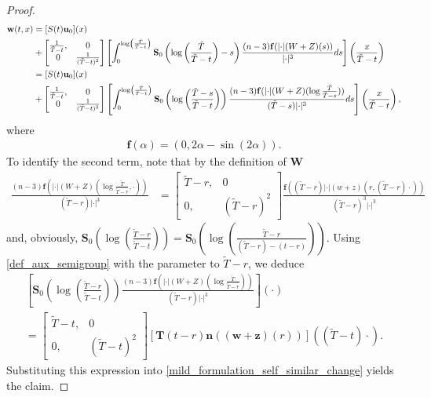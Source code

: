 \documentclass[12pt,reqno]{amsart}
\theoremstyle{plain}
\theoremstyle{remark}
\theoremstyle{plain}
\theoremstyle{definition}
\numberwithin{equation}{section}
\numberwithin{equation}{section}
\begin{document}
\begin{proof}
\begin{align}
			\mathbf{w}(t,x)&=[{S}(t)\mathbf{u}_0](x)\notag\\ &+\begin{bmatrix}  \frac{1}{\tilde{T}-t}, & 0\\ 0 & \frac{1}{(\tilde{T}-t)^2}\end{bmatrix}\left[\int_0^{\log\left(\frac{\tilde{T}}{\tilde{T}-t}\right)}\mathbf{S}_0\left(\log\left(\frac{\tilde{T}}{\tilde{T}-t}\right)-s\right)\frac{(n-3)\mathbf{f}(\lvert \cdot \rvert ({W}+Z)(s)) }{\lvert \cdot \rvert^3}ds\right]\left(\frac{x}{\tilde{T}-t}\right)\notag\\ \label{mild_formulation_self_similar_change} &=[{S}(t)\mathbf{u}_0](x)\notag\\ &+\begin{bmatrix}  \frac{1}{\tilde{T}-t}, & 0\\ 0 & \frac{1}{(\tilde{T}-t)^2}\end{bmatrix}\left[\int_0^{\log\left(\frac{\tilde{T}}{\tilde{T}-t}\right)}\mathbf{S}_0\left(\log\left(\frac{\tilde{T}-s}{\tilde{T}-t}\right)\right)\frac{(n-3)\mathbf{f}(\lvert \cdot \rvert (W+Z)(\log\frac{\tilde{T}}{\tilde{T}-s})) }{(\tilde{T}-s)\lvert \cdot \rvert^3}ds\right]\left(\frac{x}{\tilde{T}-t}\right),
		\end{align}
		where 
		\begin{align*}
			\mathbf{f}(\alpha)=(0,2\alpha-\sin (2\alpha) ).
		\end{align*}
		To identify the second term, note that by the definition of $\mathbf{W}$
		\begin{align*}
			\frac{(n-3)\mathbf{f}(\lvert \cdot \rvert (W+Z)(\log\frac{\tilde{T}}{\tilde{T}-r},\cdot)) }{(\tilde{T}-r)\lvert \cdot \rvert^3}&=\begin{bmatrix}
				\tilde{T}-r, & 0 \\ 0, & (\tilde{T}-r)^2
			\end{bmatrix}\frac{\mathbf{f}((\tilde{T}-r)\lvert \cdot\rvert (w+z)(r,(\tilde{T}-r)\cdot))}{(\tilde{T}-r)^3\lvert \cdot\rvert^3}
		\end{align*}
		and, obviously, $\mathbf{S}_0\left(\log\left(\frac{\tilde{T}-r}{\tilde{T}-t}\right)\right)=\mathbf{S}_0\left(\log\left(\frac{\tilde{T}-r}{(\tilde{T}-r)-(t-r)}\right)\right)$. Using \eqref{def_aux_semigroup} with the parameter to $\tilde{T}-r$, we deduce
		\begin{multline*}
			\left[\mathbf{S}_0\left(\log\left(\frac{\tilde{T}-r}{\tilde{T}-t}\right)\right)\frac{(n-3)\mathbf{f}(\lvert \cdot \rvert (W+Z)(\log\frac{\tilde{T}}{\tilde{T}-r})) }{(\tilde{T}-r)\lvert \cdot \rvert^3}\right](\cdot)\\ =\begin{bmatrix}
				\tilde{T}-t, & 0 \\ 0, & (\tilde{T}-t)^2
			\end{bmatrix} [\mathbf{T}(t-r) \mathbf{n}((\mathbf{w}+\mathbf{z})(r))]\left((\tilde{T}-t)\cdot\right).   
		\end{multline*}
		Substituting this expression into \eqref{mild_formulation_self_similar_change} yields the claim.
	\end{proof}
\end{document}
